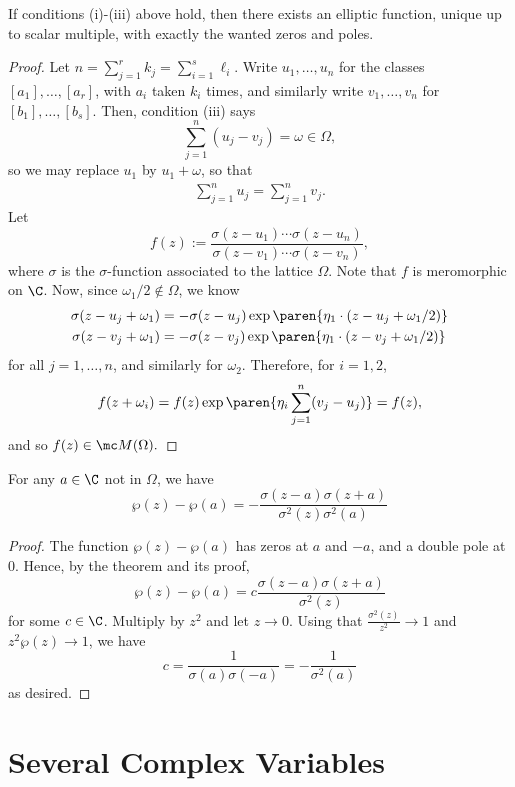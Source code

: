 \documentclass[11pt]{report}
\begin{document}
\begin{thm}
    If conditions (i)-(iii) above hold, then there exists an elliptic function, unique up to scalar multiple, with exactly the wanted zeros and poles.
\end{thm}

\begin{proof}
    Let $n = \sum_{j=1}^rk_j=\sum_{i=1}^s\ell_i$. Write $u_1,\dots,u_n$ for the classes $[a_1],\dots,[a_r]$, with $a_i$ taken $k_i$ times, and similarly write $v_1,\dots,v_n$ for $[b_1],\dots,[b_s]$. Then, condition (iii) says
    $$\sum_{j=1}^n(u_j-v_j) = \omega \in \Omega,$$
    so we may replace $u_1$ by $u_1+\omega$, so that
    \begin{align*}
        \sum_{j=1}^nu_j=\sum_{j=1}^nv_j.
    \end{align*}
    Let
    $$f(z) := \frac{\sigma(z-u_1)\cdots \sigma(z-u_n)}{\sigma(z-v_1)\cdots \sigma(z-v_n)},$$
    where $\sigma$ is the $\sigma$-function associated to the lattice $\Omega$. Note that $f$ is meromorphic on $\C$. Now, since $\omega_1/2 \not \in \Omega$, we know
    \begin{align*}
       \sigma(z-u_j+\omega_1) &= -\sigma(z-u_j)\exp\paren{ \eta_1\cdot (z-u_j+\omega_1/2 )}
       \\ \sigma(z-v_j+\omega_1) &= -\sigma(z-v_j)\exp\paren{ \eta_1\cdot (z-v_j+\omega_1/2 )}
    \end{align*}
    for all $j=1,\dots,n$, and similarly for $\omega_2$. Therefore, for $i=1,2$,
    $$f(z+\omega_i) = f(z)\exp \paren{\eta_i \sum_{j=1}^n(v_j-u_j)}=f(z),$$
    and so $f(z) \in \mc M(\Omega).$
\end{proof}

\begin{cor}
    For any $a \in \C$ not in $\Omega$, we have
    $$\wp(z)-\wp(a) = -\frac{\sigma(z-a)\sigma(z+a)}{\sigma^2(z)\sigma^2(a)}$$
\end{cor}

\begin{proof}
    The function $\wp(z)-\wp(a)$ has zeros at $a$ and $-a$, and a double pole at $0$. Hence, by the theorem and its proof,
    $$\wp(z)-\wp(a) = c\frac{\sigma(z-a)\sigma(z+a)}{\sigma^2(z)}$$
    for some $c \in \C$. Multiply by $z^2$ and let $z \to 0$. Using that $\frac{\sigma^2(z)}{z^2}\to 1$ and $z^2\wp(z) \to 1$, we have
    $$c = \frac{1}{\sigma(a)\sigma(-a)}=-\frac{1}{\sigma^2(a)}$$
    as desired.
\end{proof}

\section{Several Complex Variables}
\end{document}
